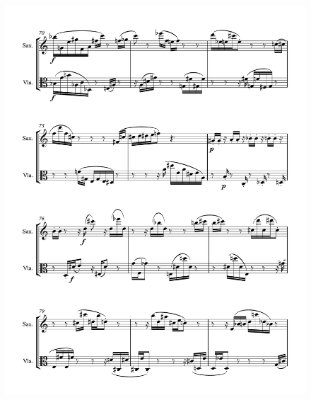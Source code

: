 \begin{figure}[htbp]
    \centering
	\includegraphics[width=6.5in]{figures/Sax_Viola_7.pdf}
\end{figure}


